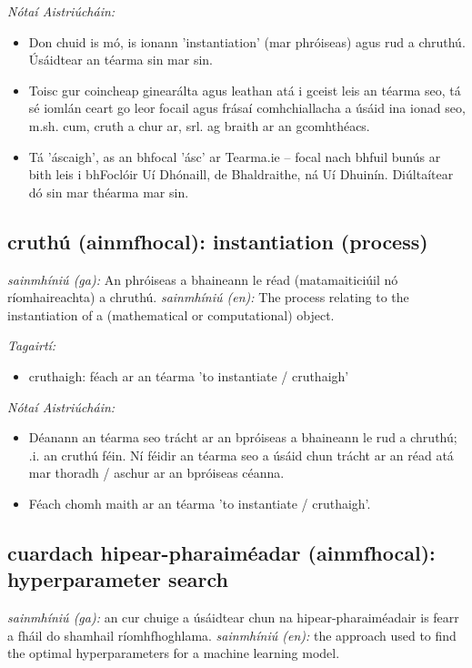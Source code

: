 \documentclass{article}
\begin{document}
 \noindent \textit{Nótaí Aistriúcháin:}
\begin{itemize}
	\item Don chuid is mó, is ionann 'instantiation' (mar phróiseas) agus rud a chruthú. Úsáidtear an téarma sin mar sin.
	\item Toisc gur coincheap ginearálta agus leathan atá i gceist leis an téarma seo, tá sé iomlán ceart go leor focail agus frásaí comhchiallacha a úsáid ina ionad seo, m.sh. cum, cruth a chur ar, srl. ag braith ar an gcomhthéacs.
	\item Tá 'áscaigh', as an  bhfocal 'ásc' ar Tearma.ie -- focal nach bhfuil bunús ar bith leis i bhFoclóir Uí Dhónaill, de Bhaldraithe, ná Uí Dhuinín. Diúltaítear dó sin mar théarma mar sin.
\end{itemize}


\subsection*{cruthú (ainmfhocal): instantiation (process)} 
 \noindent \textit{sainmhíniú (ga):} An phróiseas a bhaineann le réad (matamaiticiúil nó ríomhaireachta) a chruthú.
\newline\newline
 \noindent \textit{sainmhíniú (en):} The process relating to the instantiation of a (mathematical or computational) object.
\newline

 \noindent \textit{Tagairtí:}
\begin{itemize}
	\item cruthaigh: féach ar an téarma 'to instantiate / cruthaigh'
\end{itemize}

 \noindent \textit{Nótaí Aistriúcháin:}
\begin{itemize}
	\item Déanann an téarma seo trácht ar an bpróiseas a bhaineann le rud a chruthú; .i. an cruthú féin. Ní féidir an téarma seo a úsáid chun trácht ar an réad atá mar thoradh / aschur ar an bpróiseas céanna.
	\item Féach chomh maith ar an téarma 'to instantiate / cruthaigh'.
\end{itemize}


\subsection*{cuardach hipear-pharaiméadar (ainmfhocal): hyperparameter search} 
 \noindent \textit{sainmhíniú (ga):} an cur chuige a úsáidtear chun na hipear-pharaiméadair is fearr a fháil do shamhail ríomhfhoghlama.
\newline\newline
 \noindent \textit{sainmhíniú (en):} the approach used to find the optimal hyperparameters for a machine learning model.
\newline
\end{document}
